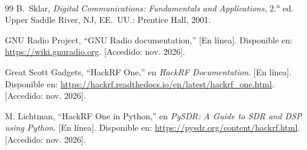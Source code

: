 \begin{thebibliography}{99}
B.~Sklar, \emph{Digital Communications: Fundamentals and Applications},
2.\textsuperscript{a} ed. Upper Saddle River, NJ, EE.~UU.: Prentice Hall, 2001.

GNU Radio Project, ``GNU Radio documentation,'' [En línea]. Disponible en:
\url{https://wiki.gnuradio.org}. [Accedido: nov. 2026].


Great Scott Gadgets, ``HackRF One,'' en \emph{HackRF Documentation}. [En línea].
Disponible en: \url{https://hackrf.readthedocs.io/en/latest/hackrf_one.html}.
[Accedido: nov. 2026].

M. Lichtman, ``HackRF One in Python,'' en \emph{PySDR: A Guide to SDR and DSP
using Python}. [En línea]. Disponible en:
\url{https://pysdr.org/content/hackrf.html}. [Accedido: nov. 2026].

\end{thebibliography}
